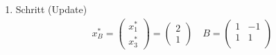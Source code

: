 \documentclass[a4paper]{scrartcl}
\begin{document}
\begin{enumerate}[label=\bfseries\arabic*.]
\begin{enumerate}[1.]
\begin{enumerate}[1.]
                    \item Schritt (Update)
                        \begin{gather}
                            x_B^* =
                            \begin{pmatrix}
                                x_1^* \\ x_3^*
                            \end{pmatrix}
                            =
                            \begin{pmatrix}
                                2 \\ 1
                            \end{pmatrix}
                            \quad
                            B =
                            \begin{pmatrix}
                                1 & -1 \\
                                1 &  1 \\
                            \end{pmatrix}
                        \end{gather}

                \end{enumerate}

        \end{enumerate}


\end{enumerate}
\end{document}
